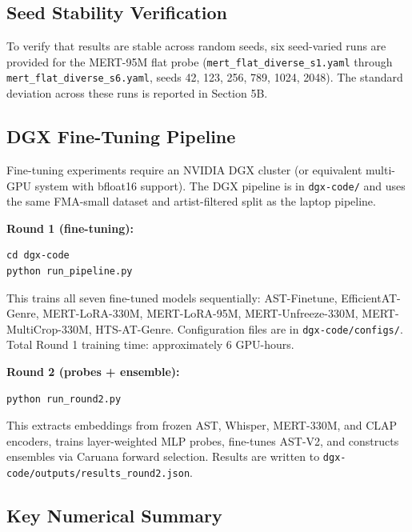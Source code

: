 \documentclass[conference]{IEEEtran}
\begin{document}
\subsection{Seed Stability
Verification}\label{g.-seed-stability-verification}

To verify that results are stable across random seeds, six seed-varied
runs are provided for the MERT-95M flat probe
(\texttt{mert\_flat\_diverse\_s1.yaml} through
\texttt{mert\_flat\_diverse\_s6.yaml}, seeds 42, 123, 256, 789, 1024,
2048). The standard deviation across these runs is reported in Section
5B.

\subsection{DGX Fine-Tuning
Pipeline}\label{h.-dgx-fine-tuning-pipeline}

Fine-tuning experiments require an NVIDIA DGX cluster (or equivalent
multi-GPU system with bfloat16 support). The DGX pipeline is in
\texttt{dgx-code/} and uses the same FMA-small dataset and
artist-filtered split as the laptop pipeline.

\textbf{Round 1 (fine-tuning):}

\begin{verbatim}
cd dgx-code
python run_pipeline.py
\end{verbatim}

This trains all seven fine-tuned models sequentially: AST-Finetune,
EfficientAT-Genre, MERT-LoRA-330M, MERT-LoRA-95M, MERT-Unfreeze-330M,
MERT-MultiCrop-330M, HTS-AT-Genre. Configuration files are in
\texttt{dgx-code/configs/}. Total Round 1 training time: approximately 6
GPU-hours.

\textbf{Round 2 (probes + ensemble):}

\begin{verbatim}
python run_round2.py
\end{verbatim}

This extracts embeddings from frozen AST, Whisper, MERT-330M, and CLAP
encoders, trains layer-weighted MLP probes, fine-tunes AST-V2, and
constructs ensembles via Caruana forward selection. Results are written
to \texttt{dgx-code/outputs/results\_round2.json}.

\subsection{Key Numerical Summary}\label{i.-key-numerical-summary}
\end{document}
